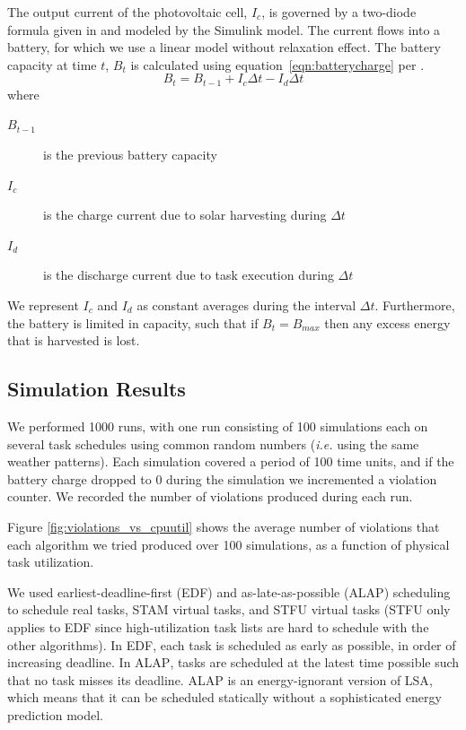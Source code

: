 The output current of the photovoltaic cell, $I_c$, is governed by a two-diode formula given in \cite{marwali1997probabilistic} and modeled by the Simulink model.  The current flows into a battery, for which we use a linear model without relaxation effect.  The battery capacity at time $t$, $B_t$ is calculated using equation~\ref{eqn:batterycharge} per \cite{niyato2007sleep}.
\begin{equation}
 B_t = B_{t-1} + I_c \Delta t - I_d \Delta t
\label{eqn:batterycharge}
\end{equation}
where 
\begin{description}
\item[$B_{t-1}$] is the previous battery capacity
\item[$I_c$] is the charge current due to solar harvesting during $\Delta t$
\item[$I_d$] is the discharge current due to task execution during $\Delta t$
\end{description}
We represent $I_c$ and $I_d$  as constant averages during the interval $\Delta t$. Furthermore, the battery is
limited in capacity, such that if $B_t = B_{max}$ then any excess energy that is harvested is lost.

\subsection{Simulation Results}
We performed 1000 runs, with one run consisting of 100 simulations each on several task schedules using common random numbers (\emph{i.e.} using the same weather patterns).  Each simulation covered a period of 100 time units, and if the battery charge dropped to 0 during the simulation we incremented a violation counter.  We recorded the number of violations produced during each run.  

Figure \ref{fig:violations_vs_cpuutil} shows the average number of violations that each algorithm we tried produced over 100 simulations, as a function of physical task utilization.

We used earliest-deadline-first (\textsc{EDF}) and as-late-as-possible (\textsc{ALAP}) scheduling to schedule real tasks, \textsc{STAM} virtual tasks, and \textsc{STFU} virtual tasks (\textsc{STFU} only applies to \textsc{EDF} since high-utilization task lists are hard to schedule with the other algorithms).  In \textsc{EDF}, each task is scheduled as early as possible, in order of increasing deadline.  In \textsc{ALAP}, tasks are scheduled at the latest time possible such that no task misses its deadline.  \textsc{ALAP} is an energy-ignorant version of \textsc{LSA}, which means that it can be scheduled statically without a sophisticated energy prediction model.  

